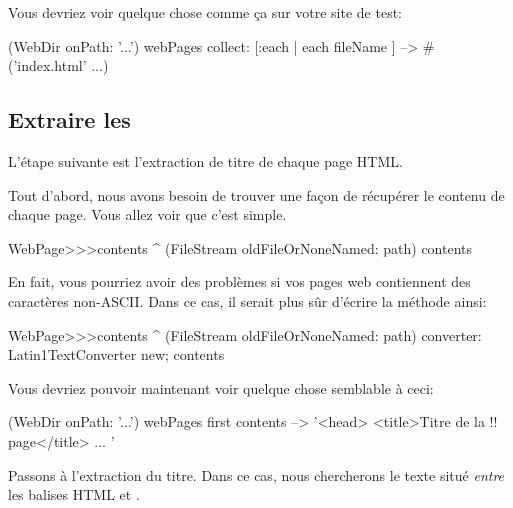 \documentclass[a4paper,10pt,twoside]{book}
\begin{document}
\noindent{} Vous devriez voir quelque chose comme ça sur votre site de test: 

\begin{code}{}
(WebDir onPath: '...') webPages collect: [:each | each fileName ]
  --> #('index.html' ...)
\end{code}

\subsection{Extraire les \regexmatches}

L'étape suivante est l'extraction de titre de chaque page HTML.

Tout d'abord, nous avons besoin de trouver une façon de récupérer le
contenu de chaque page. Vous allez voir que c'est simple.


\begin{code}{}
WebPage>>>contents
	^ (FileStream oldFileOrNoneNamed: path) contents
\end{code}

En fait, vous pourriez avoir des problèmes si vos pages web
contiennent des caractères non-ASCII. Dans ce cas, il serait plus sûr
d'écrire la méthode ainsi:

\begin{code}{}
WebPage>>>contents
	^ (FileStream oldFileOrNoneNamed: path)
		converter: Latin1TextConverter new;
		contents
\end{code}

\noindent{} Vous devriez pouvoir maintenant voir quelque chose semblable à ceci:

\begin{code}{}
(WebDir onPath: '...') webPages first contents --> '<head>
<title>Titre de la !! page</title>
...
'
\end{code}

Passons à l'extraction du titre. Dans ce cas, nous chercherons le
texte situé \emph{entre} les balises HTML  et . 
\end{document}
